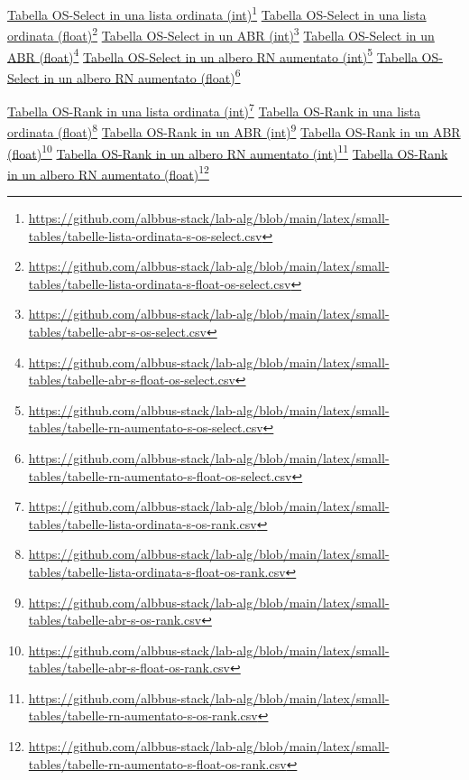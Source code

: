 \documentclass[onecolumn]{article}
\newcommand\anchor[2]{%
  \href{#2}{#1}\footnote{\url{#2}}%
}
\begin{document}
\noindent
\anchor{Tabella OS-Select in una lista ordinata (int)}{https://github.com/albbus-stack/lab-alg/blob/main/latex/small-tables/tabelle-lista-ordinata-s-os-select.csv} \label{label:lista-ordinata-s-os-select}
\newline
\anchor{Tabella OS-Select in una lista ordinata (float)}{https://github.com/albbus-stack/lab-alg/blob/main/latex/small-tables/tabelle-lista-ordinata-s-float-os-select.csv} \label{label:lista-ordinata-s-float-os-select}
\newline
\anchor{Tabella OS-Select in un ABR (int)}{https://github.com/albbus-stack/lab-alg/blob/main/latex/small-tables/tabelle-abr-s-os-select.csv} \label{label:abr-s-os-select}
\newline
\anchor{Tabella OS-Select in un ABR (float)}{https://github.com/albbus-stack/lab-alg/blob/main/latex/small-tables/tabelle-abr-s-float-os-select.csv} \label{label:abr-s-float-os-select}
\newline
\anchor{Tabella OS-Select in un albero RN aumentato (int)}{https://github.com/albbus-stack/lab-alg/blob/main/latex/small-tables/tabelle-rn-aumentato-s-os-select.csv} \label{label:rn-aumentato-s-os-select}
\newline
\anchor{Tabella OS-Select in un albero RN aumentato (float)}{https://github.com/albbus-stack/lab-alg/blob/main/latex/small-tables/tabelle-rn-aumentato-s-float-os-select.csv} \label{label:rn-aumentato-s-float-os-select}

\newpage

\noindent
\anchor{Tabella OS-Rank in una lista ordinata (int)}{https://github.com/albbus-stack/lab-alg/blob/main/latex/small-tables/tabelle-lista-ordinata-s-os-rank.csv} \label{label:lista-ordinata-s-os-rank}
\newline
\anchor{Tabella OS-Rank in una lista ordinata (float)}{https://github.com/albbus-stack/lab-alg/blob/main/latex/small-tables/tabelle-lista-ordinata-s-float-os-rank.csv} \label{label:lista-ordinata-s-float-os-rank}
\newline
\anchor{Tabella OS-Rank in un ABR (int)}{https://github.com/albbus-stack/lab-alg/blob/main/latex/small-tables/tabelle-abr-s-os-rank.csv} \label{label:abr-s-os-rank}
\newline
\anchor{Tabella OS-Rank in un ABR (float)}{https://github.com/albbus-stack/lab-alg/blob/main/latex/small-tables/tabelle-abr-s-float-os-rank.csv} \label{label:abr-s-float-os-rank}
\newline
\anchor{Tabella OS-Rank in un albero RN aumentato (int)}{https://github.com/albbus-stack/lab-alg/blob/main/latex/small-tables/tabelle-rn-aumentato-s-os-rank.csv} \label{label:rn-aumentato-s-os-rank}
\newline
\anchor{Tabella OS-Rank in un albero RN aumentato (float)}{https://github.com/albbus-stack/lab-alg/blob/main/latex/small-tables/tabelle-rn-aumentato-s-float-os-rank.csv} \label{label:rn-aumentato-s-float-os-rank}
\end{document}
